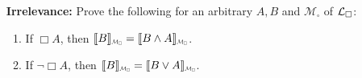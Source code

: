\documentclass[a4paper, 11pt]{article} %
\newcommand*{\Scale}[2][4]{\scalebox{#1}{$#2$}}%
\begin{document}
\begin{enumerate}[leftmargin=1.2in,labelsep=.15in]
\begin{enumerate}[label=(\arabic*),resume]
	\end{enumerate}
\item[\bf Irrelevance:] Prove the following for an arbitrary $A,B$ and $\mathcal{M}_\square$ of $\mathcal{L}_\square$: 
	\begin{enumerate}[label=(\arabic*),resume]\small
	\item If $\Box A$, then $\interpret{B}_{\Scale[0.5]{\mathcal{M}_\square}}=\interpret{B\wedge A}_{\Scale[0.5]{\mathcal{M}_\square}}$.
	\item If $\neg\Box A$, then $\interpret{B}_{\Scale[0.5]{\mathcal{M}_\square}}=\interpret{B\vee A}_{\Scale[0.5]{\mathcal{M}_\square}}$.
	\end{enumerate}
\end{enumerate}


\vfill








\begin{small} %
\singlespacing %
\setlength{\bibsep}{0.5pt} %
\thispagestyle{empty} %
\end{small} %
\end{document}

